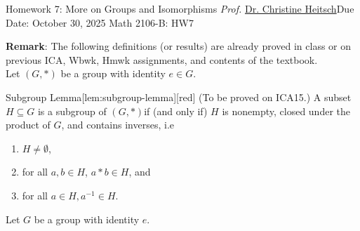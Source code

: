 \newpage{}
{Homework 7: More on Groups and Isomorphisms}
{\textit{Prof.} \href{https://ceheitsch.github.io/webpage/}{Dr. Christine Heitsch}}{Due Date: October 30, 2025}
{Math 2106-B: HW7}


\newpage
\textbf{Remark}: The following definitions (or results) are already proved in class or on previous ICA, 
Wbwk, Hmwk assignments, and contents of the textbook.\\
Let $(G, *)$ be a group with identity $e \in G$.
\begin{define}{Subgroup Lemma}[lem:subgroup-lemma][red]
  (To be proved on ICA15.) A subset $H \subseteq G$ is a subgroup of $(G, *)$if (and only if) 
  $H$ is nonempty, closed under the product of $G$, and contains inverses, i.e 
  \begin{enumerate}
    \item $H \neq \emptyset$,
    \item for all $a, b \in H$, $a * b \in H$, and
    \item for all $a \in H, a^{-1} \in H$.
  \end{enumerate}
\end{define}
\newpage
Let $G$ be a group with identity $e$.
